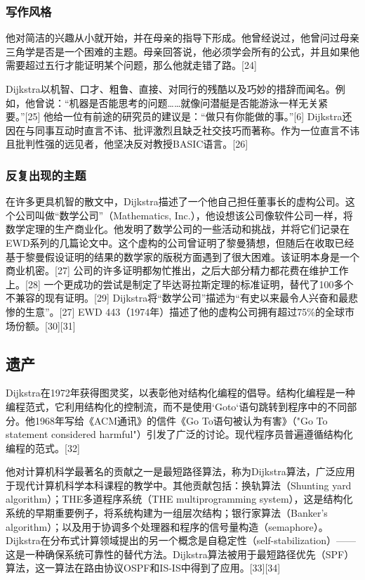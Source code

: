 \subsubsection{写作风格}
他对简洁的兴趣从小就开始，并在母亲的指导下形成。他曾经说过，他曾问过母亲三角学是否是一个困难的主题。母亲回答说，他必须学会所有的公式，并且如果他需要超过五行才能证明某个问题，那么他就走错了路。[24]

Dijkstra以机智、口才、粗鲁、直接、对同行的残酷以及巧妙的措辞而闻名。例如，他曾说：“机器是否能思考的问题……就像问潜艇是否能游泳一样无关紧要。”[25] 他给一位有前途的研究员的建议是：“做只有你能做的事。”[6] Dijkstra还因在与同事互动时直言不讳、批评激烈且缺乏社交技巧而著称。作为一位直言不讳且批判性强的远见者，他坚决反对教授BASIC语言。[26]
\subsubsection{反复出现的主题}
在许多更具机智的散文中，Dijkstra描述了一个他自己担任董事长的虚构公司。这个公司叫做“数学公司”（Mathematics, Inc.），他设想该公司像软件公司一样，将数学定理的生产商业化。他发明了数学公司的一些活动和挑战，并将它们记录在EWD系列的几篇论文中。这个虚构的公司曾证明了黎曼猜想，但随后在收取已经基于黎曼假设证明的结果的数学家的版税方面遇到了很大困难。该证明本身是一个商业机密。[27] 公司的许多证明都匆忙推出，之后大部分精力都花费在维护工作上。[28] 一个更成功的尝试是制定了毕达哥拉斯定理的标准证明，替代了100多个不兼容的现有证明。[29] Dijkstra将“数学公司”描述为“有史以来最令人兴奋和最悲惨的生意”。[27] EWD 443（1974年）描述了他的虚构公司拥有超过75\%的全球市场份额。[30][31]
\subsection{遗产}
Dijkstra在1972年获得图灵奖，以表彰他对结构化编程的倡导。结构化编程是一种编程范式，它利用结构化的控制流，而不是使用`Goto`语句跳转到程序中的不同部分。他1968年写给《ACM通讯》的信件《Go To语句被认为有害》（"Go To statement considered harmful"）引发了广泛的讨论。现代程序员普遍遵循结构化编程的范式。[32]

他对计算机科学最著名的贡献之一是最短路径算法，称为Dijkstra算法，广泛应用于现代计算机科学本科课程的教学中。其他贡献包括：换轨算法（Shunting yard algorithm）；THE多道程序系统（THE multiprogramming system），这是结构化系统的早期重要例子，将系统构建为一组层次结构；银行家算法（Banker's algorithm）；以及用于协调多个处理器和程序的信号量构造（semaphore）。Dijkstra在分布式计算领域提出的另一个概念是自稳定性（self-stabilization）——这是一种确保系统可靠性的替代方法。Dijkstra算法被用于最短路径优先（SPF）算法，这一算法在路由协议OSPF和IS-IS中得到了应用。[33][34]
